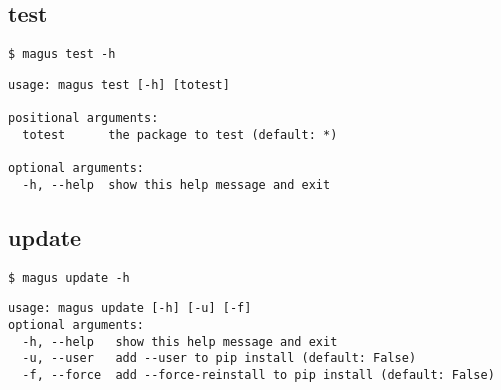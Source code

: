 \documentclass[12pt,oneside]{book}
\begin{document}
\subsection{test}
\begin{tcolorbox}
    \begin{verbatim}
$ magus test -h
    \end{verbatim}
    \tcblower
    \begin{verbatim}
usage: magus test [-h] [totest]

positional arguments:
  totest      the package to test (default: *)

optional arguments:
  -h, --help  show this help message and exit
    \end{verbatim}
\end{tcolorbox}

\subsection{update}
\begin{tcolorbox}
    \begin{verbatim}
$ magus update -h
    \end{verbatim}
    \tcblower
    \begin{verbatim}
usage: magus update [-h] [-u] [-f]
optional arguments:
  -h, --help   show this help message and exit
  -u, --user   add --user to pip install (default: False)
  -f, --force  add --force-reinstall to pip install (default: False)
    \end{verbatim}
\end{tcolorbox}
\end{document}
